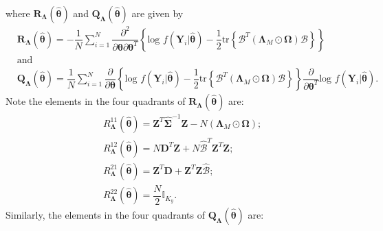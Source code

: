 where $\bm{R}_{\bm{\Lambda}}(\hat{\bm{\theta}})$ and $\bm{Q}_{\bm{\Lambda}}(\hat{\bm{\theta}})$ are given by
\begin{align}
& \bm{R}_{\bm{\Lambda}}(\hat{\bm{\theta}}) = -\dfrac{1}{N} \sum_{i=1}^{N} \dfrac{\partial^2}{\partial \bm{\theta} \partial \bm{\theta}^T} \left\{\text{log }f(\bm{Y}_i|\hat{\bm{\theta}}) - \dfrac{1}{2}\text{tr} \left\{\bm{\mathcal{B}}^T \left(\bm{\Lambda}_M \odot \bm{\Omega} \right) \bm{\mathcal{B}}\right\} \right\} \nonumber \\
& \text{and} \nonumber \\
& \bm{Q}_{\bm{\Lambda}}(\hat{\bm{\theta}}) = \dfrac{1}{N} \sum_{i=1}^{N} \dfrac{\partial}{\partial \bm{\theta}} \left\{\text{log }f(\bm{Y}_i|\hat{\bm{\theta}}) - \dfrac{1}{2}\text{tr} \left\{\bm{\mathcal{B}}^T \left(\bm{\Lambda}_M \odot \bm{\Omega} \right) \bm{\mathcal{B}} \right\} \right\}\dfrac{\partial}{\partial \bm{\theta}^T}\text{log }f(\bm{Y}_i|\hat{\bm{\theta}}). \nonumber
\end{align}
Note the elements in the four quadrants of $\bm{R}_{\bm{\Lambda}}(\hat{\bm{\theta}})$ are:
\begin{align}
& R^{11}_{\bm{\Lambda}}(\hat{\bm{\theta}}) = \bm{Z}^T \hat{\bm{\Sigma}}^{-1} \bm{Z} - N \left(\bm{\Lambda}_M \odot \bm{\Omega} \right); \nonumber \\
& R^{12}_{\bm{\Lambda}}(\hat{\bm{\theta}}) = N \bm{D}^T\bm{Z} + N \hat{\bm{\mathcal{B}}}^T \bm{Z}^T\bm{Z}; \nonumber \\
& R^{21}_{\bm{\Lambda}}(\hat{\bm{\theta}}) = \bm{Z}^T\bm{D} + \bm{Z}^T\bm{Z}\hat{\bm{\mathcal{B}}}; \nonumber \\
& R^{22}_{\bm{\Lambda}}(\hat{\bm{\theta}}) = \dfrac{N}{2} \mathbb{I}_{K_y}. \nonumber
\end{align}
Similarly, the elements in the four quadrants of $\bm{Q}_{\bm{\Lambda}}(\hat{\bm{\theta}})$ are:

